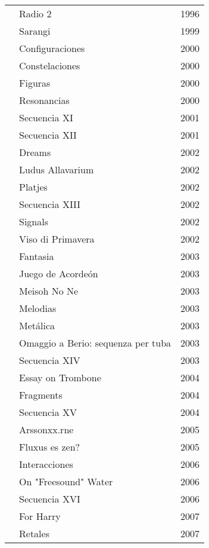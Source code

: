 \begin{center}
\begin{longtable}{ p{}  p{}  p{} }
& Radio 2 & 1996 \\ \cmidrule (r){2-3} 
& Sarangi & 1999 \\ \cmidrule (r){2-3} 
& Configuraciones & 2000 \\ \cmidrule (r){2-3} 
& Constelaciones & 2000 \\ \cmidrule (r){2-3} 
& Figuras & 2000 \\ \cmidrule (r){2-3} 
& Resonancias & 2000 \\ \cmidrule (r){2-3} 
& Secuencia XI & 2001 \\ \cmidrule (r){2-3} 
& Secuencia XII & 2001 \\ \cmidrule (r){2-3} 
& Dreams & 2002 \\ \cmidrule (r){2-3} 
& Ludus Allavarium & 2002 \\ \cmidrule (r){2-3} 
& Platjes & 2002 \\ \cmidrule (r){2-3} 
& Secuencia XIII & 2002 \\ \cmidrule (r){2-3} 
& Signals & 2002 \\ \cmidrule (r){2-3} 
& Viso di Primavera & 2002 \\ \cmidrule (r){2-3} 
& Fantasia & 2003 \\ \cmidrule (r){2-3} 
& Juego de Acordeón & 2003 \\ \cmidrule (r){2-3} 
& Meisoh No Ne & 2003 \\ \cmidrule (r){2-3} 
& Melodias & 2003 \\ \cmidrule (r){2-3} 
& Metálica & 2003 \\ \cmidrule (r){2-3} 
& Omaggio a Berio: sequenza per tuba & 2003 \\ \cmidrule (r){2-3} 
& Secuencia XIV & 2003 \\ \cmidrule (r){2-3} 
& Essay on Trombone & 2004 \\ \cmidrule (r){2-3} 
& Fragments & 2004 \\ \cmidrule (r){2-3} 
& Secuencia  XV & 2004 \\ \cmidrule (r){2-3} 
& Arssonxx.rne & 2005 \\ \cmidrule (r){2-3} 
& Fluxus es zen? & 2005 \\ \cmidrule (r){2-3} 
& Interacciones & 2006 \\ \cmidrule (r){2-3} 
& On "Freesound" Water & 2006 \\ \cmidrule (r){2-3} 
& Secuencia XVI & 2006 \\ \cmidrule (r){2-3} 
& For Harry & 2007 \\ \cmidrule (r){2-3} 
& Retales & 2007 \\ \cmidrule (r){2-3} 

\end{longtable}
\end{center}
